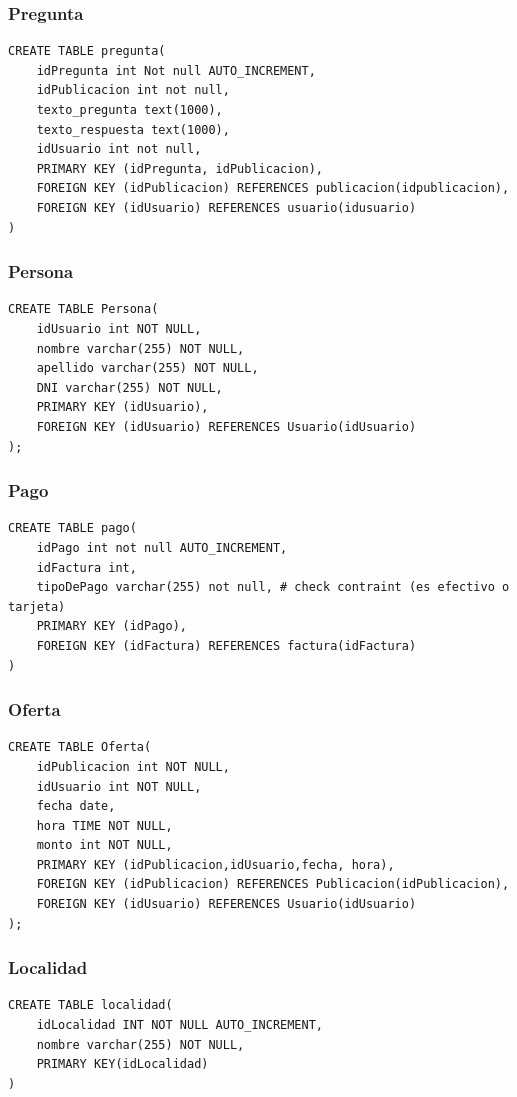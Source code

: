 \documentclass[a4paper, 10pt, twoside]{article}
\begin{document}
\subsubsection{Pregunta}
\begin{verbatim}
CREATE TABLE pregunta(
	idPregunta int Not null AUTO_INCREMENT,
    idPublicacion int not null,
    texto_pregunta text(1000),
    texto_respuesta text(1000),
	idUsuario int not null,
    PRIMARY KEY (idPregunta, idPublicacion),
    FOREIGN KEY (idPublicacion) REFERENCES publicacion(idpublicacion),
    FOREIGN KEY (idUsuario) REFERENCES usuario(idusuario)
)
\end{verbatim}
\subsubsection{Persona}
\begin{verbatim}
CREATE TABLE Persona(
	idUsuario int NOT NULL,
	nombre varchar(255) NOT NULL,
	apellido varchar(255) NOT NULL,
	DNI varchar(255) NOT NULL,
    PRIMARY KEY (idUsuario),
    FOREIGN KEY (idUsuario) REFERENCES Usuario(idUsuario)
);
\end{verbatim}
\subsubsection{Pago}
\begin{verbatim}
CREATE TABLE pago(
	idPago int not null AUTO_INCREMENT,
	idFactura int,
    tipoDePago varchar(255) not null, # check contraint (es efectivo o tarjeta)
    PRIMARY KEY (idPago),
    FOREIGN KEY (idFactura) REFERENCES factura(idFactura)
)
\end{verbatim}
\subsubsection{Oferta}
\begin{verbatim}
CREATE TABLE Oferta(
	idPublicacion int NOT NULL,
	idUsuario int NOT NULL,
	fecha date, 
    hora TIME NOT NULL,
	monto int NOT NULL,
    PRIMARY KEY (idPublicacion,idUsuario,fecha, hora),
    FOREIGN KEY (idPublicacion) REFERENCES Publicacion(idPublicacion),
	FOREIGN KEY (idUsuario) REFERENCES Usuario(idUsuario)
);
\end{verbatim}
\subsubsection{Localidad}
\begin{verbatim}
CREATE TABLE localidad(
	idLocalidad INT NOT NULL AUTO_INCREMENT,
    nombre varchar(255) NOT NULL,
    PRIMARY KEY(idLocalidad)
)
\end{verbatim}
\end{document}
